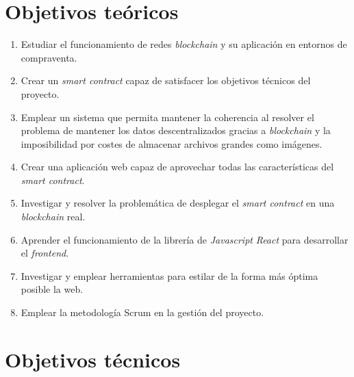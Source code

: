 
\section{Objetivos teóricos}

\begin{enumerate}
  \item Estudiar el funcionamiento de redes \textit{blockchain} y su aplicación en entornos de compraventa.
  \item Crear un \textit{smart contract} capaz de satisfacer los objetivos técnicos del proyecto.
  \item Emplear un sistema que permita mantener la coherencia al resolver el problema de mantener los datos descentralizados gracias a \textit{blockchain} y la imposibilidad por costes de almacenar archivos grandes como imágenes.
  \item Crear una aplicación web capaz de aprovechar todas las características del \textit{smart contract}.
  \item Investigar y resolver la problemática de desplegar el \textit{smart contract} en una \textit{blockchain}  real.
  \item Aprender el funcionamiento de la librería de \textit{Javascript} \textit{React} para desarrollar el \textit{frontend}.
  \item Investigar y emplear herramientas para estilar de la forma más óptima posible la web.
  \item Emplear la metodología Scrum en la gestión del proyecto.
\end{enumerate}


\section{Objetivos técnicos}

